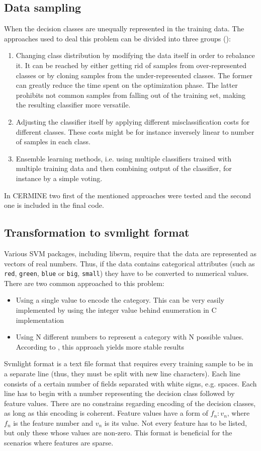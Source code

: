 \subsection{Data sampling}
When the decision classes are unequally represented in the training data. The approaches used to deal this problem can be divided into three groups (\cite{Choi}):
\begin{enumerate}
\item Changing class distribution by modifying the data itself in order to rebalance it. It can be reached by either getting rid of samples from over-represented classes or by cloning samples from the under-represented classes. The former can greatly reduce the time spent on the optimization phase. The latter prohibits not common samples from falling out of the training set, making the resulting classifier more versatile.
\item Adjusting the classifier itself by applying different misclassification costs for different classes. These costs might be for instance inversely linear to number of samples in each class.
\item Ensemble learning methods, i.e. using multiple classifiers trained with multiple training data and then combining output of the classifier, for instance by a simple voting.
\end{enumerate}
In CERMINE two first of the mentioned approaches were tested and the second one is included in the final code.
\
\subsection{Transformation to svmlight format}
Various SVM packages, including libsvm, require that the data are represented as vectors of real numbers. Thus, if the data contains categorical attributes (such as \verb+red+, \verb+green+, \verb+blue+ or \verb+big+, \verb+small+) they have to be converted to numerical values. There are two common approached to this problem:
\begin{itemize}
\item Using a single value to encode the category. This can be very easily implemented by using the integer value behind enumeration in C implementation
\item Using N different numbers to represent a category with N possible values. According to \cite{Chih-WeiHsu2010}, this approach yields more stable results
\end{itemize}
\qquad
Svmlight format is a text file format that requires every training sample to be in a separate line (thus, they must be split with new line characters). Each line consists of a certain number of fields separated with white signs, e.g. spaces. Each line has to begin with a number representing the decision class followed by feature values. There are no constrains regarding encoding of the decision classes, as long as this encoding is coherent. Feature values have a form of $f_n:v_n$, where $f_n$ is the feature number and $v_n$ is its value. Not every feature has to be listed, but only these whose values are non-zero. This format is beneficial for the scenarios where features are sparse.

